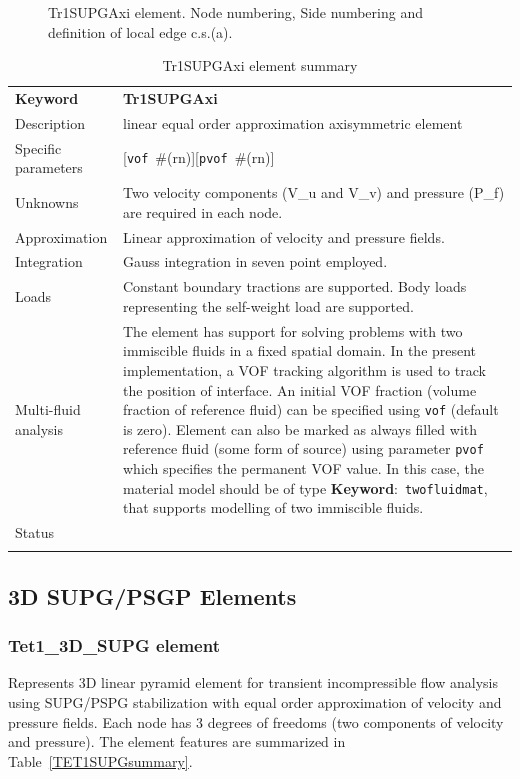 \documentclass[a4paper]{article}
\newcommand{\descitem}[1]{{\noindent \textbf{#1}}:}
\newcommand{\elemkeyword}[1]{\descitem{Keyword}~\param{#1}} %
\newcommand{\param}[1]{\texttt{#1}} %
\newcommand{\optional}[1]{[#1]} %
\newcommand{\field}[2]{\param{#1}~\#{\tiny(#2)}} %
\newcommand{\optField}[2]{\optional{\field{#1}{#2}}}
\newcommand{\templabel}{}%
\newcommand{\tempcaption}{}%
\newcounter{nelpar}
\newenvironment{elementsummary}[5]{%
  \gdef\tempcaption{#4}%
  \gdef\templabel{#5}%
  \setcounter{nelpar}{0}%
  \begin{center} %
    \begin{table}[!htb] %
      \begin{tabular}{|l|p{9cm}|}\hline %
        {\bf Keyword} & \bf{#1}\\ %
        {Description} & {#2}\\ %
        {Specific parameters} & {#3}\\ \hline %
}{
  \\ \hline %
      \end{tabular}%
      \caption{\tempcaption}%
      \label{\templabel}%
    \end{table}%
  \end{center}%
}
\newcommand{\elementDescription}[2]{{#1} & {#2}\\}
\begin{document}
\begin{figure}[htb]
 \centering
 \begin{makeimage}
  
 \end{makeimage}
 \caption{Tr1SUPGAxi element. Node numbering, Side numbering and
 definition of local edge c.s.(a).}
 \label{Tr1SUPGAxifig}
\end{figure}

\begin{elementsummary}{Tr1SUPGAxi}{linear equal order approximation axisymmetric element}
  {\optField{vof}{rn}\optField{pvof}{rn}}{Tr1SUPGAxi element summary}{Tr1SUPGAxisummary}
\elementDescription{Unknowns}{Two velocity components (V\_u and V\_v) and pressure (P\_f) are required in each node.}
\elementDescription{Approximation}{Linear approximation of velocity and pressure fields.}
\elementDescription{Integration}{Gauss integration in seven point employed.}
\elementDescription{Loads}{Constant boundary tractions are supported. Body loads
representing the self-weight load are supported.}
\elementDescription{Multi-fluid analysis}{The element has support for solving
problems with two immiscible fluids in
a fixed spatial domain. In the present implementation, a VOF tracking algorithm
is used to track the position of interface. An initial VOF fraction
(volume fraction of reference fluid) can be specified using
\param{vof} (default is zero). Element can also be marked as always
filled with reference fluid (some form of source) using parameter
\param{pvof} which specifies the permanent VOF value. In this case,
the material model should be of type \elemkeyword{twofluidmat}, that
supports modelling of two immiscible fluids.}
\elementDescription{Status}{}
\end{elementsummary}


\clearpage
\subsection{3D SUPG/PSGP Elements}
\subsubsection{Tet1\_3D\_SUPG element}
\label{PY1_3D_SUPG}
Represents 3D linear pyramid element for transient
incompressible flow analysis using SUPG/PSPG stabilization with equal order
approximation of velocity and pressure fields. Each node has 3 degrees
of freedoms (two components of velocity and pressure). The element features are summarized in Table~\ref{TET1SUPGsummary}.
\end{document}
